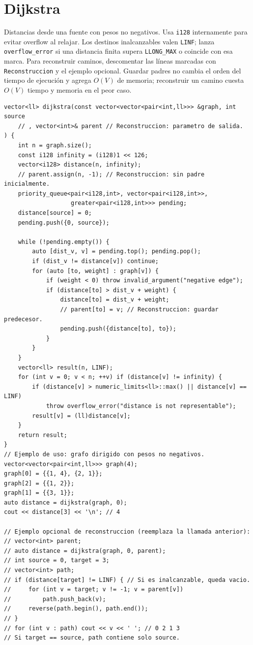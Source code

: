 \section{Dijkstra}

Distancias desde una fuente con pesos no negativos.
Usa \texttt{i128} internamente para evitar overflow al relajar. Los destinos
inalcanzables valen \texttt{LINF}; lanza \texttt{overflow\_error} si una distancia
finita supera \texttt{LLONG\_MAX} o coincide con esa marca.
Para reconstruir caminos, descomentar las l\'ineas marcadas con
\texttt{Reconstruccion} y el ejemplo opcional. Guardar padres no cambia
el orden del tiempo de ejecuci\'on y agrega $O(V)$ de memoria;
reconstruir un camino cuesta $O(V)$ tiempo y memoria en el peor caso.

\begin{lstlisting}[style=cpp]
vector<ll> dijkstra(const vector<vector<pair<int,ll>>> &graph, int source
    // , vector<int>& parent // Reconstruccion: parametro de salida.
) {
    int n = graph.size();
    const i128 infinity = (i128)1 << 126;
    vector<i128> distance(n, infinity);
    // parent.assign(n, -1); // Reconstruccion: sin padre inicialmente.
    priority_queue<pair<i128,int>, vector<pair<i128,int>>,
                   greater<pair<i128,int>>> pending;
    distance[source] = 0;
    pending.push({0, source});

    while (!pending.empty()) {
        auto [dist_v, v] = pending.top(); pending.pop();
        if (dist_v != distance[v]) continue;
        for (auto [to, weight] : graph[v]) {
            if (weight < 0) throw invalid_argument("negative edge");
            if (distance[to] > dist_v + weight) {
                distance[to] = dist_v + weight;
                // parent[to] = v; // Reconstruccion: guardar predecesor.
                pending.push({distance[to], to});
            }
        }
    }
    vector<ll> result(n, LINF);
    for (int v = 0; v < n; ++v) if (distance[v] != infinity) {
        if (distance[v] > numeric_limits<ll>::max() || distance[v] == LINF)
            throw overflow_error("distance is not representable");
        result[v] = (ll)distance[v];
    }
    return result;
}
// Ejemplo de uso: grafo dirigido con pesos no negativos.
vector<vector<pair<int,ll>>> graph(4);
graph[0] = {{1, 4}, {2, 1}};
graph[2] = {{1, 2}};
graph[1] = {{3, 1}};
auto distance = dijkstra(graph, 0);
cout << distance[3] << '\n'; // 4

// Ejemplo opcional de reconstruccion (reemplaza la llamada anterior):
// vector<int> parent;
// auto distance = dijkstra(graph, 0, parent);
// int source = 0, target = 3;
// vector<int> path;
// if (distance[target] != LINF) { // Si es inalcanzable, queda vacio.
//     for (int v = target; v != -1; v = parent[v])
//         path.push_back(v);
//     reverse(path.begin(), path.end());
// }
// for (int v : path) cout << v << ' '; // 0 2 1 3
// Si target == source, path contiene solo source.
\end{lstlisting}

